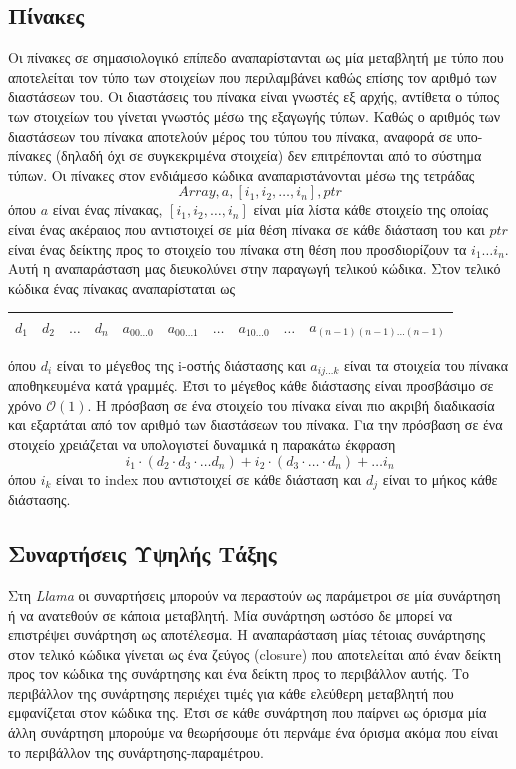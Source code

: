\documentclass[12pt]{article}
\newcommand{\Llama}{\textit{Llama }}
\begin{document}
\subsection{Πίνακες}
Οι πίνακες σε σημασιολογικό επίπεδο αναπαρίστανται ως μία μεταβλητή με τύπο που αποτελείται τον τύπο των στοιχείων που περιλαμβάνει καθώς επίσης τον αριθμό των διαστάσεων του. Οι διαστάσεις του πίνακα είναι γνωστές εξ αρχής, αντίθετα ο τύπος των στοιχείων του γίνεται γνωστός μέσω της εξαγωγής τύπων. Καθώς ο αριθμός των διαστάσεων του πίνακα αποτελούν μέρος του τύπου του πίνακα, αναφορά σε υπο-πίνακες (δηλαδή όχι σε συγκεκριμένα στοιχεία) δεν επιτρέπονται από το σύστημα τύπων.
Οι πίνακες στον ενδιάμεσο κώδικα αναπαριστάνονται μέσω της τετράδας $$Array, a, [i_1,i_2, \ldots, i_n], ptr$$ όπου $a$ είναι ένας πίνακας, $[i_1, i_2, \ldots, i_n]$ είναι μία λίστα κάθε στοιχείο της οποίας είναι ένας ακέραιος που αντιστοιχεί σε μία θέση πίνακα σε κάθε διάσταση του και $ptr$ είναι ένας δείκτης προς το στοιχείο του πίνακα στη θέση που προσδιορίζουν τα $i_1 \ldots i_n$. Αυτή η αναπαράσταση μας διευκολύνει στην παραγωγή τελικού κώδικα. Στον τελικό κώδικα ένας πίνακας αναπαρίσταται ως 
\begin{table}[htbp]
\centering
    \begin{tabular}{|l|c|l|l|l|l|l|l|l|c|}
    \hline
    $d_1$ & $d_2$ & $\ldots$ & $d_n$ & $a_{00\ldots0}$ & $a_{00\ldots1}$ & $\ldots$ & $a_{10\ldots0}$ & $\ldots$ & $a_{(n-1)(n-1)\ldots(n-1)}$ \\ \hline
    \end{tabular}
\end{table}
όπου $d_i$ είναι το μέγεθος της i-οστής διάστασης και $a_{ij \ldots k}$ είναι τα στοιχεία του πίνακα αποθηκευμένα κατά γραμμές. Έτσι το μέγεθος κάθε διάστασης είναι προσβάσιμο σε χρόνο $\mathcal{O}(1)$. Η πρόσβαση σε ένα στοιχείο του πίνακα είναι πιο ακριβή διαδικασία και εξαρτάται από τον αριθμό των διαστάσεων του πίνακα. Για την πρόσβαση σε ένα στοιχείο χρειάζεται να υπολογιστεί δυναμικά η παρακάτω έκφραση
$$i_1 \cdot (d_2 \cdot d_3 \cdot \ldots d_n) + i_2 \cdot (d_3 \cdot \ldots \cdot d_n) + \ldots i_n$$
όπου $i_k$ είναι το index που αντιστοιχεί σε κάθε διάσταση και $d_j$ είναι το μήκος κάθε διάστασης.
\subsection{Συναρτήσεις Υψηλής Τάξης}
Στη \Llama οι συναρτήσεις μπορούν να περαστούν ως παράμετροι σε μία συνάρτηση ή να ανατεθούν σε κάποια μεταβλητή. Μία συνάρτηση ωστόσο δε μπορεί να επιστρέψει συνάρτηση ως αποτέλεσμα. Η αναπαράσταση μίας τέτοιας συνάρτησης στον τελικό κώδικα γίνεται ως ένα ζεύγος (closure) που αποτελείται από έναν δείκτη προς τον κώδικα της συνάρτησης και ένα δείκτη προς το περιβάλλον αυτής. Το περιβάλλον της συνάρτησης περιέχει τιμές για κάθε ελεύθερη μεταβλητή που εμφανίζεται στον κώδικα της. Έτσι σε κάθε συνάρτηση που παίρνει ως όρισμα μία άλλη συνάρτηση μπορούμε να θεωρήσουμε ότι περνάμε ένα όρισμα ακόμα που είναι το περιβάλλον της συνάρτησης-παραμέτρου.
\end{document}
